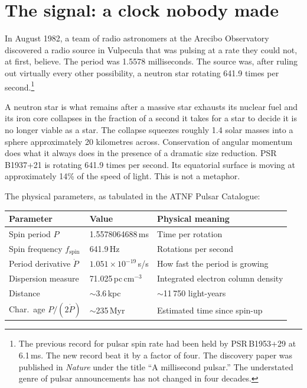 \documentclass[11pt,a4paper,openany]{book}
\begin{document}
\section{The signal: a clock nobody made}

In August 1982, a team of radio astronomers at the Arecibo Observatory
discovered a radio source in Vulpecula that was pulsing at a rate they could
not, at first, believe. The period was 1.5578 milliseconds. The source was,
after ruling out virtually every other possibility, a neutron star rotating
641.9 times per second.\footnote{The previous record for pulsar spin rate
had been held by PSR\,B1953+29 at 6.1\,ms. The new record beat it by a
factor of four. The discovery paper was published in \emph{Nature} under the
title ``A millisecond pulsar.'' The understated genre of pulsar announcements
has not changed in four decades.}

A neutron star is what remains after a massive star exhausts its nuclear fuel
and its iron core collapses in the fraction of a second it takes for a star to
decide it is no longer viable as a star. The collapse squeezes roughly 1.4 solar
masses into a sphere approximately 20 kilometres across. Conservation of angular
momentum does what it always does in the presence of a dramatic size reduction.
PSR\,B1937+21 is rotating 641.9 times per second. Its equatorial surface is
moving at approximately 14\% of the speed of light. This is not a metaphor.

The physical parameters, as tabulated in the ATNF Pulsar Catalogue:

\medskip
\begin{longtable}{p{3.5cm}p{4.5cm}p{5.5cm}}
\toprule
\textbf{Parameter} & \textbf{Value} & \textbf{Physical meaning} \\
\midrule
\endhead
Spin period $P$ & 1.5578064688\,ms & Time per rotation \\
Spin frequency $f_\mathrm{spin}$ & 641.9\,Hz & Rotations per second \\
Period derivative $\dot{P}$ & $1.051 \times 10^{-19}$\,s/s & How fast the period is growing \\
Dispersion measure & 71.025\,pc\,cm$^{-3}$ & Integrated electron column density \\
Distance & $\sim$3.6\,kpc & $\sim$11\,750 light-years \\
Char.\ age $P/(2\dot{P})$ & $\sim$235\,Myr & Estimated time since spin-up \\
\bottomrule
\end{longtable}
\medskip
\end{document}
